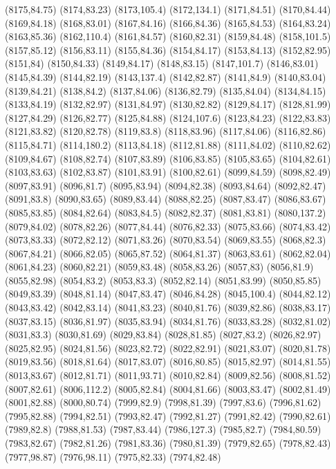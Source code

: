 (8175,84.75)
(8174,83.23)
(8173,105.4)
(8172,134.1)
(8171,84.51)
(8170,84.44)
(8169,84.18)
(8168,83.01)
(8167,84.16)
(8166,84.36)
(8165,84.53)
(8164,83.24)
(8163,85.36)
(8162,110.4)
(8161,84.57)
(8160,82.31)
(8159,84.48)
(8158,101.5)
(8157,85.12)
(8156,83.11)
(8155,84.36)
(8154,84.17)
(8153,84.13)
(8152,82.95)
(8151,84)
(8150,84.33)
(8149,84.17)
(8148,83.15)
(8147,101.7)
(8146,83.01)
(8145,84.39)
(8144,82.19)
(8143,137.4)
(8142,82.87)
(8141,84.9)
(8140,83.04)
(8139,84.21)
(8138,84.2)
(8137,84.06)
(8136,82.79)
(8135,84.04)
(8134,84.15)
(8133,84.19)
(8132,82.97)
(8131,84.97)
(8130,82.82)
(8129,84.17)
(8128,81.99)
(8127,84.29)
(8126,82.77)
(8125,84.88)
(8124,107.6)
(8123,84.23)
(8122,83.83)
(8121,83.82)
(8120,82.78)
(8119,83.8)
(8118,83.96)
(8117,84.06)
(8116,82.86)
(8115,84.71)
(8114,180.2)
(8113,84.18)
(8112,81.88)
(8111,84.02)
(8110,82.62)
(8109,84.67)
(8108,82.74)
(8107,83.89)
(8106,83.85)
(8105,83.65)
(8104,82.61)
(8103,83.63)
(8102,83.87)
(8101,83.91)
(8100,82.61)
(8099,84.59)
(8098,82.49)
(8097,83.91)
(8096,81.7)
(8095,83.94)
(8094,82.38)
(8093,84.64)
(8092,82.47)
(8091,83.8)
(8090,83.65)
(8089,83.44)
(8088,82.25)
(8087,83.47)
(8086,83.67)
(8085,83.85)
(8084,82.64)
(8083,84.5)
(8082,82.37)
(8081,83.81)
(8080,137.2)
(8079,84.02)
(8078,82.26)
(8077,84.44)
(8076,82.33)
(8075,83.66)
(8074,83.42)
(8073,83.33)
(8072,82.12)
(8071,83.26)
(8070,83.54)
(8069,83.55)
(8068,82.3)
(8067,84.21)
(8066,82.05)
(8065,87.52)
(8064,81.37)
(8063,83.61)
(8062,82.04)
(8061,84.23)
(8060,82.21)
(8059,83.48)
(8058,83.26)
(8057,83)
(8056,81.9)
(8055,82.98)
(8054,83.2)
(8053,83.3)
(8052,82.14)
(8051,83.99)
(8050,85.85)
(8049,83.39)
(8048,81.14)
(8047,83.47)
(8046,84.28)
(8045,100.4)
(8044,82.12)
(8043,83.42)
(8042,83.14)
(8041,83.23)
(8040,81.76)
(8039,82.86)
(8038,83.17)
(8037,83.15)
(8036,81.97)
(8035,83.94)
(8034,81.76)
(8033,83.28)
(8032,81.02)
(8031,83.3)
(8030,81.69)
(8029,83.84)
(8028,81.85)
(8027,83.2)
(8026,82.97)
(8025,82.95)
(8024,81.56)
(8023,82.72)
(8022,82.91)
(8021,83.07)
(8020,81.78)
(8019,83.56)
(8018,81.64)
(8017,83.07)
(8016,80.85)
(8015,82.97)
(8014,81.55)
(8013,83.67)
(8012,81.71)
(8011,93.71)
(8010,82.84)
(8009,82.56)
(8008,81.52)
(8007,82.61)
(8006,112.2)
(8005,82.84)
(8004,81.66)
(8003,83.47)
(8002,81.49)
(8001,82.88)
(8000,80.74)
(7999,82.9)
(7998,81.39)
(7997,83.6)
(7996,81.62)
(7995,82.88)
(7994,82.51)
(7993,82.47)
(7992,81.27)
(7991,82.42)
(7990,82.61)
(7989,82.8)
(7988,81.53)
(7987,83.44)
(7986,127.3)
(7985,82.7)
(7984,80.59)
(7983,82.67)
(7982,81.26)
(7981,83.36)
(7980,81.39)
(7979,82.65)
(7978,82.43)
(7977,98.87)
(7976,98.11)
(7975,82.33)
(7974,82.48)
